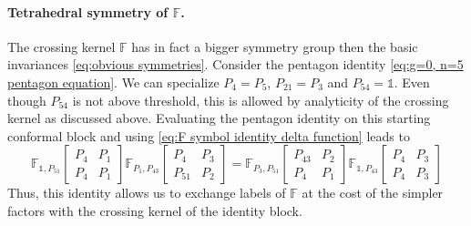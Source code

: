 \documentclass[12pt,a4paper]{article}
\newcommand{\be}{\begin{equation}}
\newcommand{\ee}{\end{equation}}
\newcommand\id{\mathds{1}}
\begin{document}
\paragraph{Tetrahedral symmetry of $\mathbb{F}$.} The crossing kernel $\mathbb{F}$ has in fact a bigger symmetry group then the basic invariances \eqref{eq:obvious symmetries}. Consider the pentagon identity \eqref{eq:g=0, n=5 pentagon equation}. We can specialize $P_4=P_5$, $P_{21}=P_3$ and $P_{54}=\id$. Even though $P_{54}$ is not above threshold, this is allowed by analyticity of the crossing kernel as discussed above.
Evaluating the pentagon identity on this starting conformal block and using \eqref{eq:F symbol identity delta function} leads to
\be 
\mathbb{F}_{\id,P_{51}}\!\begin{bmatrix}
    P_4 & P_1 \\P_4 & P_1
\end{bmatrix} 
\mathbb{F}_{P_1,P_{43}}\!\begin{bmatrix}
    P_4 & P_3 \\P_{51} & P_2
\end{bmatrix}=
\mathbb{F}_{P_3,P_{51}}\!\begin{bmatrix}
    P_{43} & P_2 \\ P_4 & P_1
\end{bmatrix}
\mathbb{F}_{\id,P_{43}}\!\begin{bmatrix}
    P_4 & P_3 \\
    P_4 & P_3
\end{bmatrix} \label{eq:exchange symmetry F degenerated pentagon}
\ee
Thus, this identity allows us to exchange labels of $\mathbb{F}$ at the cost of the simpler factors with the crossing kernel of the identity block.
\end{document}
